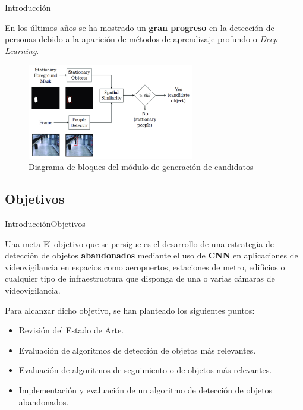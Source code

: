 
\begin{frame}{Introducción}

\justifying
En los últimos años se ha mostrado un \textbf{gran progreso} en la detección de personas debido a la aparición de métodos de aprendizaje profundo o \textit{Deep Learning}.

\begin{figure}[ht]
\centering
\includegraphics[width=0.65\textwidth]{Images/introduccion/Block-diagram-Stationary-detection.png}
\caption{\label{fig:diagram-stationary-detection}Diagrama de bloques del módulo de generación de candidatos}
\end{figure}
    
\end{frame}


\subsection{Objetivos}

\begin{frame}{Introducción}{Objetivos}

\begin{exampleblock}{Una meta}
\justifying
El objetivo que se persigue es el desarrollo de una estrategia de detección de objetos \textbf{abandonados} mediante el uso de \textbf{CNN} en aplicaciones de videovigilancia en espacios como aeropuertos, estaciones de metro, edificios o cualquier tipo de infraestructura que disponga de una o varias cámaras de videovigilancia.
\end{exampleblock}

\vspace{0.3cm}
Para alcanzar dicho objetivo, se han planteado los siguientes puntos:
\vspace{0.1cm}

\begin{itemize}
    \justifying
    \item Revisión del Estado de Arte.
    \item Evaluación de algoritmos de detección de objetos más relevantes.
    \item Evaluación de algoritmos de seguimiento o de objetos más relevantes.
    \item Implementación y evaluación de un algoritmo de detección de objetos abandonados.
\end{itemize}
  
\end{frame}